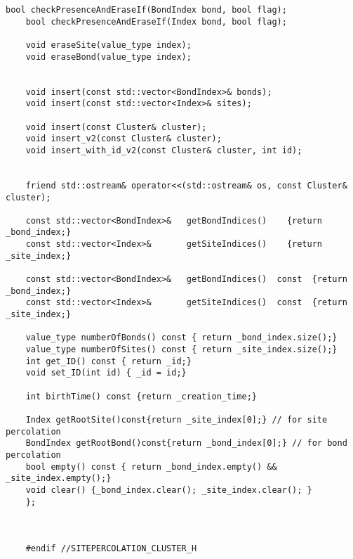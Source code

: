\begin{lstlisting}[style=CStyle]
	bool checkPresenceAndEraseIf(BondIndex bond, bool flag);
	bool checkPresenceAndEraseIf(Index bond, bool flag);
	
	void eraseSite(value_type index);
	void eraseBond(value_type index);
	
	
	void insert(const std::vector<BondIndex>& bonds);
	void insert(const std::vector<Index>& sites);
	
	void insert(const Cluster& cluster);
	void insert_v2(const Cluster& cluster);
	void insert_with_id_v2(const Cluster& cluster, int id);
	
	
	friend std::ostream& operator<<(std::ostream& os, const Cluster& cluster);
	
	const std::vector<BondIndex>&   getBondIndices()    {return _bond_index;}
	const std::vector<Index>&       getSiteIndices()    {return _site_index;}
	
	const std::vector<BondIndex>&   getBondIndices()  const  {return _bond_index;}
	const std::vector<Index>&       getSiteIndices()  const  {return _site_index;}
	
	value_type numberOfBonds() const { return _bond_index.size();}
	value_type numberOfSites() const { return _site_index.size();}
	int get_ID() const { return _id;}
	void set_ID(int id) { _id = id;}
	
	int birthTime() const {return _creation_time;}
	
	Index getRootSite()const{return _site_index[0];} // for site percolation
	BondIndex getRootBond()const{return _bond_index[0];} // for bond percolation
	bool empty() const { return _bond_index.empty() && _site_index.empty();}
	void clear() {_bond_index.clear(); _site_index.clear(); }
	};
	
	
	
	#endif //SITEPERCOLATION_CLUSTER_H
	
	\end{lstlisting}
	
